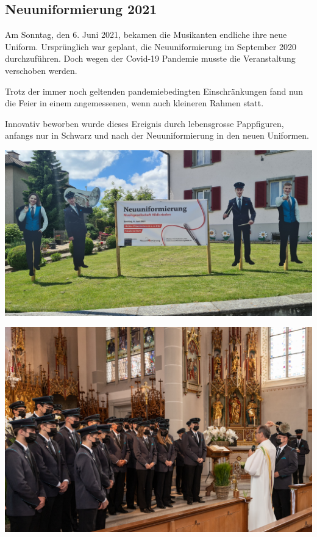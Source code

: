 \subsection*{Neuuniformierung 2021}

\begin{history}

    Am Sonntag, den 6. Juni 2021, bekamen die Musikanten endliche ihre neue
    Uniform. Ursprünglich war geplant, die Neuuniformierung im September 2020
    durchzuführen. Doch wegen der Covid-19 Pandemie musste die Veranstaltung
    verschoben werden.

    Trotz der immer noch geltenden pandemiebedingten Einschränkungen fand nun
    die Feier in einem angemessenen, wenn auch kleineren Rahmen statt.

    Innovativ beworben wurde dieses Ereignis durch lebensgrosse Pappfiguren,
    anfangs nur in Schwarz und nach der Neuuniformierung in den neuen Uniformen.

    \begin{MulticolFigure}
        \centering
        \includegraphics[width=0.93\linewidth]{./chap/2001-2024/2021/Pappnasen.jpg}
    \end{MulticolFigure}


    \begin{MulticolFigure}
        \centering
        \includegraphics[width=0.93\linewidth]{./chap/2001-2024/2021/Im-Chor-2.jpg}
    \end{MulticolFigure}


\end{history}
